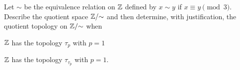 Let $\sim$ be the equivalence relation on $\mathbb{Z}$ defined by $x \sim y$ if $x \equiv y \pmod{3}$. Describe the quotient space $\mathbb{Z}/\hspace{-1mm}\sim$ and then determine, with justification, the quotient topology on $\mathbb{Z}/\hspace{-1mm}\sim$ when
	\ba
		
	\item $\mathbb{Z}$ has the topology $\tau_{p}$ with $p = 1$
	
	\item $\mathbb{Z}$ has the topology $\tau_{\tau_{\overline{p}}}$ with $p = 1$.		
	
	\ea
	
\begin{comment}

\ExerciseSolution The quotient space $\Z/\ssim$ is the set of congruence classes in $\Z_3$. That is, $(\Z/\ssim) = \{[0], [1], [2]\}$. Let $f: \Z \to \Z/\ssim$ be defined by $f(n) = [n]$.
	\ba
	\item We find the inverse images of all subsets of $\Z/\ssim$:
		\begin{itemize}
		\item $f^{-1}(\emptyset) = \emptyset$
		\item $f^{-1}(\{[0]\}) = \{n \in \Z \mid n = 3k \text{ for some } k \in \Z\}$
		\item $f^{-1}(\{[1]\}) = \{n \in \Z \mid n = 3k+1 \text{ for some } k \in \Z\}$
		\item $f^{-1}(\{[2]\}) = \{n \in \Z \mid n = 3k+2 \text{ for some } k \in \Z\}$
		\item $f^{-1}(\{[0],[1]\}) = \{n \in \Z \mid n = 3k \text{ or } n = 3k+1 \text{ for some } k \in \Z\}$
		\item $f^{-1}(\{[0],[2]\}) = \{n \in \Z \mid n = 3k \text{ or } n = 3k+2 \text{ for some } k \in \Z\}$
		\item $f^{-1}(\{[1],[2]\}) = \{n \in \Z \mid n = 3k+1 \text{ or } n = 3k+2 \text{ for some } k \in \Z\}$
		\item $f^{-1}(\Z/\ssim) = \Z$.
		\end{itemize}
The inverse images that are open are the empty set and the sets that contain $p=1$. So the quotient topology is 
\[\{\emptyset, \{[1]\}, \{[0], [1]\}, \{[1], [2]\}, \Z/\ssim\}.\]

	\item We have the same quotient space and the same inverse images. The inverse images that are open sets now are the empty set and the sets that don't contain $p=1$. So the quotient topology is
\[\{\emptyset, \{[0]\}, \{[2]\}, \{[0], [2]\},  \Z/\ssim\}.\]
	
	\ea


\end{comment}


